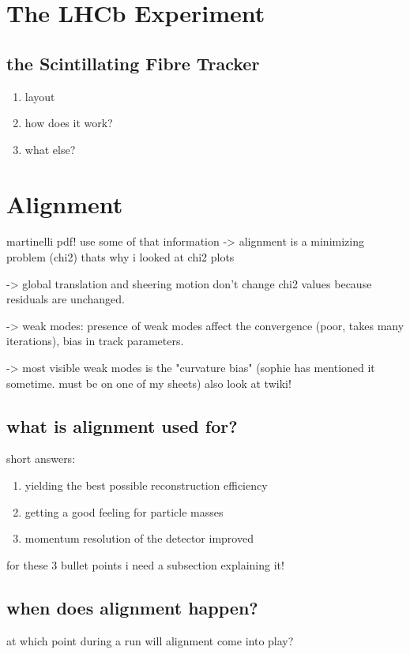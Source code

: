 \chapter{The LHCb Experiment}
\label{sec:theorie}

\section{the Scintillating Fibre Tracker}
\begin{enumerate}
  \item layout
  \item how does it work?
  \item what else?
\end{enumerate}

\chapter{Alignment}
martinelli pdf! use some of that information
-> alignment is a minimizing problem (chi2) thats why i looked at chi2 plots

-> global translation and sheering motion don't change chi2 values because residuals are unchanged.

-> weak modes: presence of weak modes affect the convergence (poor, takes many iterations), bias in track parameters.

-> most visible weak modes is the "curvature bias" (sophie has mentioned it sometime. must be on one of my sheets)
also look at twiki!
\section{what is alignment used for?}
short answers:
\begin{enumerate}
  \item yielding the best possible reconstruction efficiency
  \item getting a good feeling for particle masses
  \item momentum resolution of the detector improved
\end{enumerate}

for these 3 bullet points i need a subsection explaining it!

\section{when does alignment happen?}
at which point during a run will alignment come into play?

